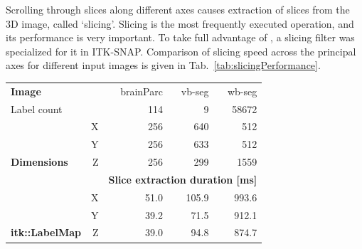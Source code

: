 \documentclass{InsightArticle}
\begin{document}
Scrolling through slices along different axes causes
extraction of slices from the 3D image, called `slicing'.
Slicing is the most frequently executed operation, and its performance is very important.
To take full advantage of ,
a slicing filter was specialized for it in ITK-SNAP.
Comparison of slicing speed across the principal axes for different input images
is given in Tab.~\ref{tab:slicingPerformance}.

\begin{table}[ht]
  \centering
    \begin{tabular}{lrrrr}
    \textbf{Image}                                               &                          & brainParc                   & vb-seg                      & wb-seg                       \\
    Label count                                                  &                          & 114                         & 9                           & 58672                        \\
                                                                 & X                        & 256                         & 640                         & 512                          \\
                                                                 & Y                        & 256                         & 633                         & 512                          \\
    \multirow{-3}{*}{\textbf{Dimensions}}                        & Z                        & 256                         & 299                         & 1559                         \\
                                                                 &                          & \multicolumn{3}{c}{\textbf{Slice extraction duration [ms]}}                              \\
                                                                 & X                        & 51.0                        & 105.9                       & 993.6                        \\
                                                                 & Y                        & 39.2                        & 71.5                        & 912.1                        \\
    \multirow{-3}{*}{\textbf{itk::LabelMap}}                     & Z                        & 39.0                        & 94.8                        & 874.7                        \\ \hline

\end{tabular}
\end{table}
\end{document}
